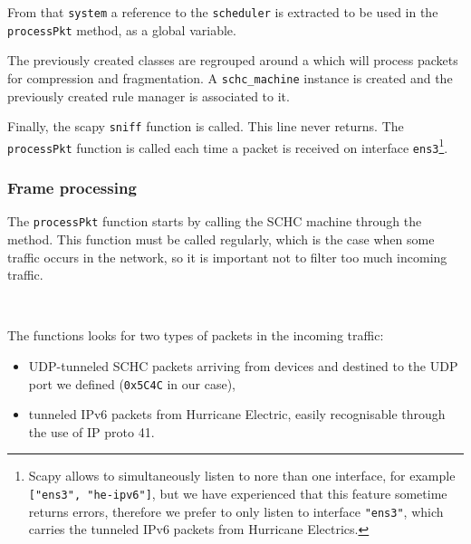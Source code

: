 From that \texttt{system} a reference to the \texttt{scheduler} is extracted to be used in the \texttt{processPkt} method, as a global variable.


The previously created classes are regrouped around a  which will process packets for compression and fragmentation. A \texttt{schc\_machine} instance is created and the previously created rule manager is associated to it.



Finally, the scapy \texttt{sniff} function is called. This line never returns. The \texttt{processPkt} function is called each time a packet is received on interface \texttt{ens3}\footnote{Scapy allows to simultaneously listen  to nore than one interface, for example \texttt{["ens3", "he-ipv6"]}, but we have experienced that this feature sometime returns errors, therefore we prefer to only listen to interface \texttt{"ens3"}, which carries the tunneled IPv6 packets from Hurricane Electrics.}.

\subsubsection{Frame processing}


The \texttt{processPkt} function starts by calling the SCHC machine through the  method. This function must be called regularly, which is the case when some traffic occurs in the network, so it is important not to filter too much incoming traffic.

~

The functions looks for two types of packets in the incoming traffic:
\begin{itemize}
    \item UDP-tunneled SCHC packets arriving from devices and destined to the UDP port we defined (\texttt{0x5C4C} in our case),
    \item tunneled IPv6 packets from Hurricane Electric, easily recognisable through the use of IP proto 41.
\end{itemize}


